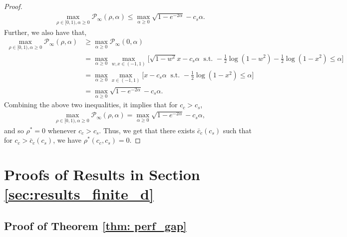 \documentclass[12pt]{article}
\theoremstyle{definition}
\theoremstyle{remark}
\begin{document}
\begin{proof}
\begin{align*}
    \max_{\rho\in[0,1) , \alpha\geq 0} \mathcal{P}_\infty (\rho, \alpha) \leq \max_{\alpha\geq 0} \sqrt{1-e^{-2\alpha}} - c_s \alpha.
\end{align*}
Further, we also have that,
\begin{align*}
    \max_{\rho\in[0,1) , \alpha\geq 0} \mathcal{P}_\infty (\rho, \alpha) & \geq \max_{ \alpha\geq 0} \mathcal{P}_\infty (0, \alpha) \\
    & = \max_{ \alpha\geq 0} \max_{w, x \in (-1,1)} \Big[\sqrt{1-w^2} x - c_s \alpha \ \text{ s.t. } -\frac{1}{2} \log(1-w^2) -\frac{1}{2} \log(1-x^2)  \leq \alpha \Big]\\
    & = \max_{ \alpha\geq 0}  \max_{x \in (-1,1)} \Big[ x - c_s \alpha \ \text{ s.t. } -\frac{1}{2} \log(1-x^2)  \leq \alpha\Big]\\
    & = \max_{\alpha\geq 0} \sqrt{1-e^{-2\alpha}} - c_s \alpha.
\end{align*}
Combining the above two inequalities, it implies that for $c_c>c_s$,
\begin{align*}
    \max_{\rho\in[0,1) , \alpha\geq 0} \mathcal{P}_\infty (\rho, \alpha) = \max_{\alpha\geq 0} \sqrt{1-e^{-2\alpha}} - c_s \alpha,
\end{align*}
and so $\rho^* = 0$ whenever $c_c>c_s$. Thus, we get that there exists $\bar c_c(c_s)$ such that for $c_c>\bar c_c(c_s)$, we have $\rho^*(c_c,c_s) =0$.
\end{proof}

\section{Proofs of Results in Section \ref{sec:results_finite_d}}

\subsection{Proof of Theorem \ref{thm: perf_gap}}
\label{app:proof_thm_perf_gap}
\end{document}

